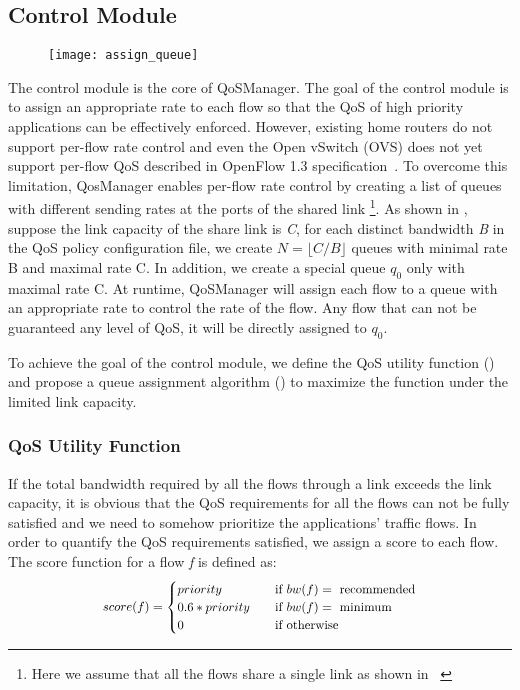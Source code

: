 \subsection{Control Module}

\begin{figure}[htb]
  \centering
  \texttt{[image: assign\_queue]}
  \caption{}
  \label{fig:assign_queue}
\end{figure}

The control module is the core of QoSManager. The goal of the control module is to assign an appropriate rate to each flow so that
the QoS of high priority applications can be effectively enforced. However, existing home routers do not support per-flow rate control
and even the Open vSwitch (OVS) does not yet support per-flow QoS described in OpenFlow 1.3 specification~\cite{openflow13}. To overcome
this limitation, QosManager enables per-flow rate control by creating a list of queues with different sending rates at the ports of
the shared link \footnote{Here we assume that all the flows share a single link as shown in ~}. As shown in ,
suppose the link capacity of the share link is \emph{C}, for each distinct bandwidth \emph{B} in the QoS policy configuration file,
we create $ N = \lfloor C / B \rfloor $ queues with minimal rate B and maximal rate C. In addition, we create a special queue $q_0$
only with maximal rate C. At runtime, QoSManager will assign each flow to a queue with an appropriate rate to control the rate of the
flow. Any flow that can not be guaranteed any level of QoS, it will be directly assigned to $q_0$.

To achieve the goal of the control module, we define the QoS utility function () and propose a queue assignment
algorithm () to maximize the function under the limited link capacity.

\subsubsection{QoS Utility Function}
\label{sect:qosUF}
If the total bandwidth required by all the flows through a link exceeds the link capacity, it is obvious that the QoS requirements for
all the flows can not be fully satisfied and we need to somehow prioritize the applications' traffic flows. In order to quantify the QoS
requirements satisfied, we assign a score to each flow. The score function for a flow \emph{f} is defined as:
\begin{equation}
\scalebox{0.9}{
  $score(f) =
    \begin{cases}
      priority       & \quad \text{if } bw(f) = \text{ recommended}\\
      0.6 * priority & \quad \text{if } bw(f) = \text{ minimum}\\
      0              & \quad \text{if } \text{otherwise}\\
    \end{cases}$
}
\end{equation}

